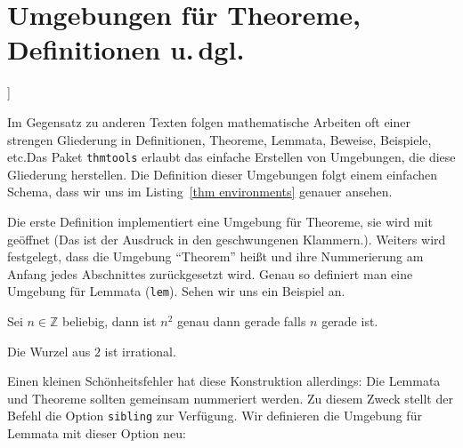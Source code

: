 
\section{Umgebungen für Theoreme, Definitionen u.\,dgl.}]

Im Gegensatz zu anderen Texten folgen mathematische Arbeiten oft einer strengen Gliederung in Definitionen, Theoreme, Lemmata, Beweise, Beispiele, etc.\@ Das Paket \texttt{thmtools} erlaubt das einfache Erstellen von Umgebungen, die diese Gliederung herstellen. Die Definition dieser Umgebungen folgt einem einfachen Schema, dass wir uns im Listing~\ref{thm environments} genauer ansehen.

\begin{figure*}
\begin{example}[caption={Beispiel für die Definition von Theoremumgebungen},
label={thm environments}]
	
\end{example}
\end{figure*}

Die erste Definition implementiert eine Umgebung für Theoreme, sie wird mit  geöffnet (Das ist der Ausdruck in den geschwungenen Klammern.). Weiters wird festgelegt, dass die Umgebung "`Theorem"' heißt und ihre Nummerierung am Anfang jedes Abschnittes zurückgesetzt wird. Genau so definiert man eine Umgebung für Lemmata (\texttt{lem}). Sehen wir uns ein Beispiel an.

\begin{LTXexample}[firstline=3]
\setcounter{thm}{0}
\setcounter{lem0}{0}
\begin{lem0}
    Sei $n \in \mathbb Z$ 
    beliebig, dann ist $n^2$ 
    genau dann gerade 
    falls $n$ gerade ist.
\end{lem0}

\begin{thm}
    Die Wurzel aus $2$ ist 
    irrational.
\end{thm}
\end{LTXexample}

Einen kleinen Schönheitsfehler hat diese Konstruktion allerdings: Die Lemmata und Theoreme sollten gemeinsam nummeriert werden. Zu diesem Zweck stellt der Befehl  die Option \texttt{sibling} zur Verfügung. Wir definieren die Umgebung für Lemmata mit dieser Option neu:

